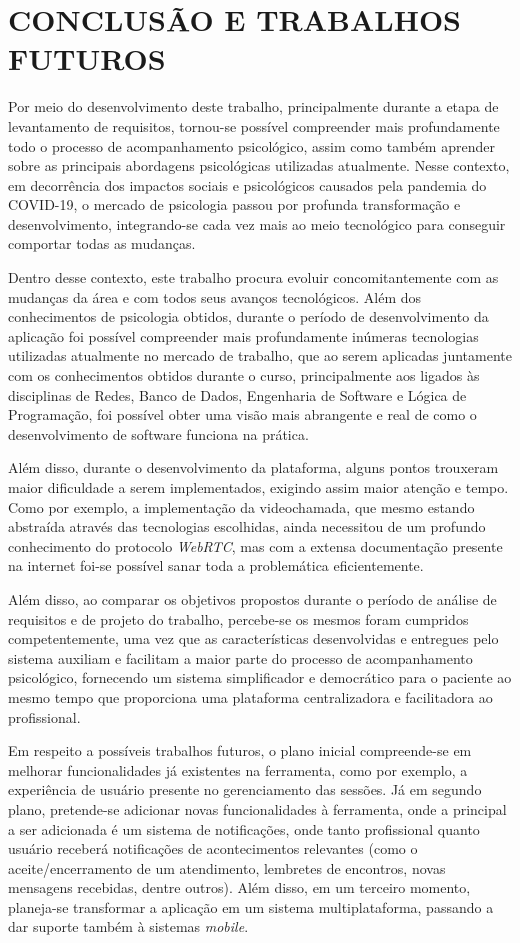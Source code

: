 \chapter{CONCLUSÃO E TRABALHOS FUTUROS}
\label{chap:conclusao}

Por meio do desenvolvimento deste trabalho, principalmente durante a etapa de levantamento de requisitos, tornou-se possível compreender mais profundamente todo o processo de acompanhamento psicológico, assim como também aprender sobre as principais abordagens psicológicas utilizadas atualmente. Nesse contexto, em decorrência dos impactos sociais e psicológicos causados pela pandemia do COVID-19, o mercado de psicologia passou por profunda transformação e desenvolvimento, integrando-se cada vez mais ao meio tecnológico para conseguir comportar todas as mudanças.

Dentro desse contexto, este trabalho procura evoluir concomitantemente com as mudanças da área e com todos seus avanços tecnológicos. Além dos conhecimentos de psicologia obtidos, durante o período de desenvolvimento da aplicação foi possível compreender mais profundamente inúmeras tecnologias utilizadas atualmente no mercado de trabalho, que ao serem aplicadas juntamente com os conhecimentos obtidos durante o curso, principalmente aos ligados às disciplinas de Redes, Banco de Dados, Engenharia de Software e Lógica de Programação, foi possível obter uma visão mais abrangente e real de como o desenvolvimento de software funciona na prática.

Além disso, durante o desenvolvimento da plataforma, alguns pontos trouxeram maior dificuldade a serem implementados, exigindo assim maior atenção e tempo. Como por exemplo, a implementação da videochamada, que mesmo estando abstraída através das tecnologias escolhidas, ainda necessitou de um profundo conhecimento do protocolo \textit{WebRTC},  mas com a extensa documentação presente na internet foi-se possível sanar toda a problemática eficientemente.

Além disso, ao comparar os objetivos propostos durante o período de análise de requisitos e de projeto do trabalho, percebe-se os mesmos foram cumpridos competentemente, uma vez que as características desenvolvidas e entregues pelo sistema auxiliam e facilitam a maior parte do processo de acompanhamento psicológico, fornecendo um sistema simplificador e democrático para o paciente ao mesmo tempo que proporciona uma plataforma centralizadora e facilitadora ao profissional.

Em respeito a possíveis trabalhos futuros, o plano inicial compreende-se em melhorar funcionalidades já existentes na ferramenta, como por exemplo, a experiência de usuário presente no gerenciamento das sessões. Já em segundo plano, pretende-se adicionar novas funcionalidades à ferramenta, onde a principal a ser adicionada é um sistema de notificações, onde tanto profissional quanto usuário receberá notificações de acontecimentos relevantes (como o aceite/encerramento de um atendimento, lembretes de encontros, novas mensagens recebidas, dentre outros). Além disso, em um terceiro momento, planeja-se transformar a aplicação em um sistema multiplataforma, passando a dar suporte também à sistemas \textit{mobile}.
